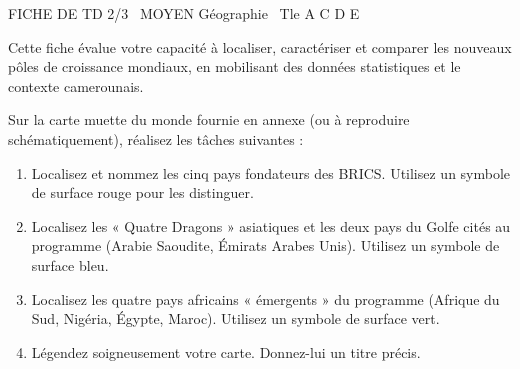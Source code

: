 \documentclass[11pt]{article}
\begin{document}
\begin{tcolorbox}[enhanced,colback=popink,colframe=popink,arc=10pt,boxrule=0pt,left=12pt,right=12pt,top=9pt,bottom=9pt]
{\color{white}\popxbold\small FICHE DE TD 2/3 \textbullet\ MOYEN \hfill Géographie \textbullet\ Tle A C D E\par}
\end{tcolorbox}
\vspace{4pt}
Cette fiche évalue votre capacité à localiser, caractériser et comparer les nouveaux pôles de croissance mondiaux, en mobilisant des données statistiques et le contexte camerounais.

\begin{exercice}
Sur la carte muette du monde fournie en annexe (ou à reproduire schématiquement), réalisez les tâches suivantes :
\begin{enumerate}
    \item Localisez et nommez les cinq pays fondateurs des BRICS. Utilisez un symbole de surface rouge pour les distinguer.
    \item Localisez les « Quatre Dragons » asiatiques et les deux pays du Golfe cités au programme (Arabie Saoudite, Émirats Arabes Unis). Utilisez un symbole de surface bleu.
    \item Localisez les quatre pays africains « émergents » du programme (Afrique du Sud, Nigéria, Égypte, Maroc). Utilisez un symbole de surface vert.
    \item Légendez soigneusement votre carte. Donnez-lui un titre précis.
\end{enumerate}
\end{exercice}
\end{document}
